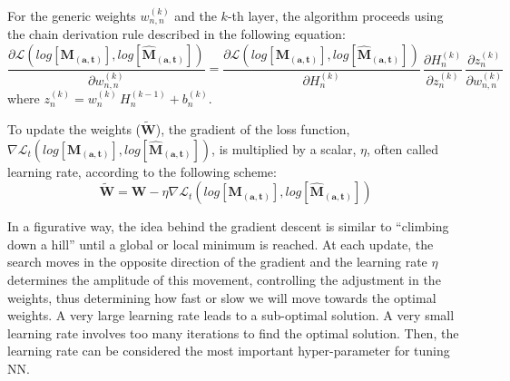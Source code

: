 \documentclass[a4,11pt]{article}
\begin{document}
For the generic weights $w_{n,n}^{(k)}$ and the $k$-th layer, the algorithm proceeds using the chain derivation rule described in the following equation:
\begin{equation}
\frac{\partial \mathcal{L}(log[\mathbf{M_{(a,t)}}],log[\mathbf{\hat{M}_{(a,t)}}])}{\partial w_{n,n}^{(k)}} =\frac{\partial \mathcal{L}(log[\mathbf{M_{(a,t)}}],log[\mathbf{\hat{M}_{(a,t)}}])}{\partial H_n^{(k)}}\,\frac{{\partial H_n^{(k)}}}{\partial z_n^{(k)}} \, \frac{\partial z_n^{(k)}}{\partial w_{n,n}^{(k)}}
 \end{equation}
where $ z_n^{(k)}=w_{n}^{(k)}\,H_{n}^{(k-1)}+b_n^{(k)}$. 

To update the weights ($\mathbf{\tilde{W}}$), the gradient of the loss function, $\nabla \mathcal{L}_t(log[\mathbf{M_{(a,t)}}],log[\mathbf{\hat{M}_{(a,t)}}])$, is multiplied by a scalar, $\eta$, often called learning rate, according to the following scheme:
\begin{equation}
\mathbf{\tilde{W}}=\mathbf{W}-\eta \nabla \mathcal{L}_t(log[\mathbf{M_{(a,t)}}],log[\mathbf{\hat{M}_{(a,t)}}])
\end{equation}

In a figurative way, the idea behind the gradient descent is similar to “climbing down a hill” until a global or local minimum is reached. At each update, the search moves in the opposite direction of the gradient and the learning rate $\eta$ determines the amplitude of this movement, controlling the adjustment in the weights, thus determining how fast or slow we will move towards the optimal weights.
A very large learning rate leads to a sub-optimal solution. A very small learning rate involves too many iterations to find the optimal solution. 
Then, the learning rate can be considered the most important hyper-parameter for tuning NN.
\end{document}
